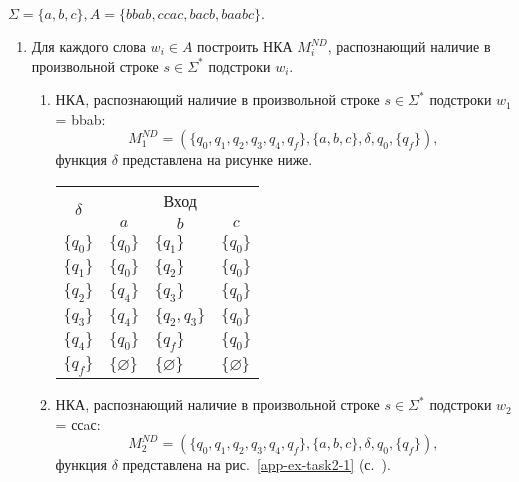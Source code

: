 $\Sigma = \{a, b, c\}, A = \{bbab, ccac, bacb, baabc\}.$
\begin{enumerate}[label=(\roman{*})]
	\item Для каждого слова $w_i \in A$ построить НКА $M^{ND}_i$, распознающий наличие в произвольной строке $s \in \Sigma^*$ подстроки $w_i$.

	\begin{enumerate}
		\item НКА, распознающий наличие в произвольной строке $s \in \Sigma^*$ подстроки $w_1$ = bbab:
%
		\[M^{ND}_1 = (\{q_0, q_1, q_2, q_3, q_4, q_f\}, \{a, b, c\}, \delta, q_0, \{q_f\}),\]
%
        функция $\delta$ представлена на рисунке ниже.
			\begin{center}
			\begin{tabular}{llll}
				\toprule
				\multicolumn{1}{c}{\multirow{2}{*}{\Large $\delta$}}
				& \multicolumn{3}{c}{Вход} \\
				\cmidrule(rl){2-4}
				& \multicolumn{1}{c}{$a$}
				& \multicolumn{1}{c}{$b$} 
				& \multicolumn{1}{c}{$c$} \\
				\midrule
				$\{q_0\}$       & $\{q_0\}$      		 & $\{q_1\}$     &$\{q_0\}$  \\
				$\{q_1\}$       & $\{q_0\}$    			 & $\{q_2\}$     &$\{q_0\}$ \\
				$\{q_2\}$       & $\{q_4\}$    			 & $\{q_3\}$     &$\{q_0\}$  \\
				$\{q_3\}$       & $\{q_4\}$    			 & $\{q_2, q_3\}$     &$\{q_0\}$  \\
				$\{q_4\}$       & $\{q_0\}$    			 & $\{q_f\}$     &$\{q_0\}$  \\
				$\{q_f\}$       & $\{\varnothing\}$    	 & $\{\varnothing\}$     &$\{\varnothing\}$  \\
				\bottomrule
			\end{tabular}
		\end{center}
		
		\item НКА, распознающий наличие в произвольной строке $s \in \Sigma^*$ подстроки $w_2$ = ссaс:
%
		\[M^{ND}_2 = (\{q_0, q_1, q_2, q_3, q_4, q_f\}, \{a, b, c\}, \delta, q_0, \{q_f\}),\]
%
        функция $\delta$ представлена на рис.~\ref{app-ex-task2-1} (с.~\pageref{app-ex-task2-1}).


\end{enumerate}
\end{enumerate}
